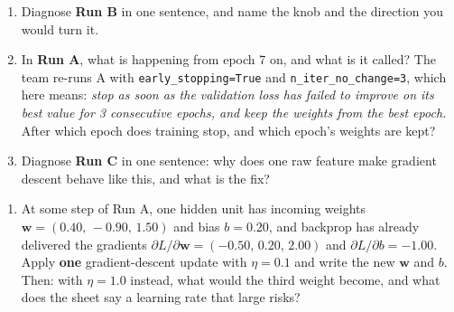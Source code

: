 \documentclass[
  11pt,
]{article}
\providecommand{\tightlist}{%
  \setlength{\itemsep}{0pt}\setlength{\parskip}{0pt}}
\begin{document}
\begin{enumerate}[label=(\roman*),leftmargin=3.2em,topsep=2pt]
\item Diagnose \textbf{Run B} in one sentence, and name the knob and the
  direction you would turn it.
\item In \textbf{Run A}, what is happening from epoch 7 on, and what is it
  called? The team re-runs A with \texttt{early\_stopping=True} and
  \texttt{n\_iter\_no\_change=3}, which here means: \emph{stop as soon as the
  validation loss has failed to improve on its best value for 3 consecutive
  epochs, and keep the weights from the best epoch.} After which epoch does
  training stop, and which epoch's weights are kept?
\item Diagnose \textbf{Run C} in one sentence: why does one raw feature make
  gradient descent behave like this, and what is the fix?
\end{enumerate}

\begin{enumerate}
\def\labelenumi{(\alph{enumi})}
\setcounter{enumi}{2}
\tightlist
\item
  At some step of Run A, one hidden unit has incoming weights
  \(\mathbf w = (0.40,\,-0.90,\,1.50)\) and bias \(b = 0.20\), and
  backprop has already delivered the gradients
  \(\partial L/\partial \mathbf w = (-0.50,\,0.20,\,2.00)\) and
  \(\partial L/\partial b = -1.00\). Apply \textbf{one} gradient-descent
  update with \(\eta = 0.1\) and write the new \(\mathbf w\) and \(b\).
  Then: with \(\eta = 1.0\) instead, what would the third weight become,
  and what does the sheet say a learning rate that large risks?
\end{enumerate}
\end{document}
